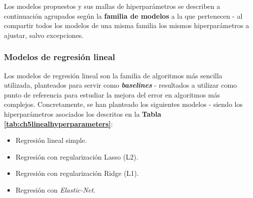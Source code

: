 Los modelos propuestos y sus mallas de hiperparámetros se describen a continuación agrupados según la \textbf{familia de modelos} a la que pertenecen - al compartir todos los modelos de una misma familia los mismos hiperparámetros a ajustar, salvo excepciones.

\subsubsection{Modelos de regresión lineal}

Los modelos de regresión lineal son la familia de algoritmos más sencilla utilizada, planteados para servir como \textbf{\textit{baselines}} - resultados a utilizar como punto de referencia para estudiar la mejora del error en algoritmos más complejos. Concretamente, se han planteado los siguientes modelos - siendo los hiperparámetros asociados los descritos en la \textbf{Tabla \ref{tab:ch5linealhyperparameters}}:

\begin{itemize}[parsep=1pt, itemsep=0pt, topsep=1pt]
	\item Regresión lineal simple.
	\item Regresión con regularización Lasso (L2).
	\item Regresión con regularización Ridge (L1).
	\item Regresión con \textit{Elastic-Net}.
\end{itemize}

